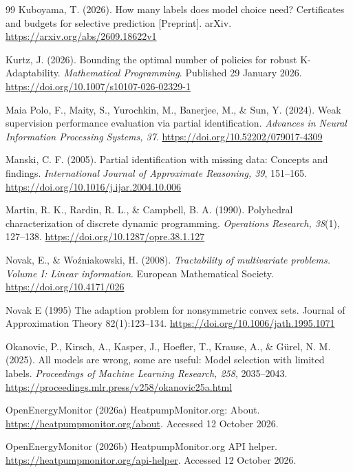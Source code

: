 \documentclass[12pt]{article}
\begin{document}
\begin{thebibliography}{99}
Kuboyama, T. (2026).
How many labels does model choice need? Certificates and budgets for selective
prediction [Preprint].
arXiv. \url{https://arxiv.org/abs/2609.18622v1}

Kurtz, J. (2026). Bounding the optimal number of policies for robust
K-Adaptability. \emph{Mathematical Programming}. Published 29 January 2026.
\url{https://doi.org/10.1007/s10107-026-02329-1}

Maia Polo, F., Maity, S., Yurochkin, M., Banerjee, M., \& Sun, Y. (2024).
Weak supervision performance evaluation via partial identification.
\emph{Advances in Neural Information Processing Systems, 37}.
\url{https://doi.org/10.52202/079017-4309}

Manski, C. F. (2005). Partial identification with missing data:
Concepts and findings. \emph{International Journal of Approximate
Reasoning, 39}, 151--165.
\url{https://doi.org/10.1016/j.ijar.2004.10.006}

Martin, R. K., Rardin, R. L., \& Campbell, B. A. (1990).
Polyhedral characterization of discrete dynamic programming.
\emph{Operations Research, 38}(1), 127--138.
\url{https://doi.org/10.1287/opre.38.1.127}

Novak, E., \& Wo{\'z}niakowski, H. (2008).
\emph{Tractability of multivariate problems. Volume I: Linear information}.
European Mathematical Society.
\url{https://doi.org/10.4171/026}

Novak E (1995) The adaption problem for nonsymmetric convex sets.
Journal of Approximation Theory 82(1):123--134.
\url{https://doi.org/10.1006/jath.1995.1071}

Okanovic, P., Kirsch, A., Kasper, J., Hoefler, T., Krause, A., \&
G\"urel, N. M. (2025). All models are wrong, some are useful:
Model selection with limited labels.
\emph{Proceedings of Machine Learning Research, 258}, 2035--2043.
\url{https://proceedings.mlr.press/v258/okanovic25a.html}

OpenEnergyMonitor (2026a) HeatpumpMonitor.org: About.
\url{https://heatpumpmonitor.org/about}. Accessed 12 October 2026.

OpenEnergyMonitor (2026b) HeatpumpMonitor.org API helper.
\url{https://heatpumpmonitor.org/api-helper}. Accessed 12 October 2026.


\end{thebibliography}
\end{document}
